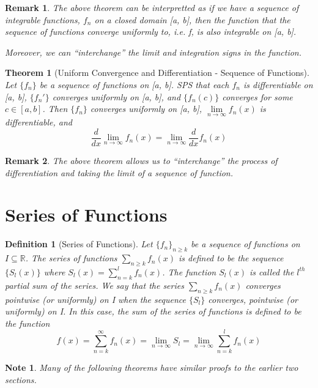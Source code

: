 \documentclass[11pt, oneside]{book}
\theoremstyle{break}
\newtheorem{thm}{Theorem}[section]
\newtheorem*{remark}{Remark}
\newtheorem*{note}{Note}
\newtheorem{defn}{Definition}[section]
\newcommand{\bb}[1]{\mathbb{#1}}		%
\begin{document}
\begin{remark}
	The above theorem can be interpretted as if we have a sequence of integrable functions, $f_n$ on a closed domain [a, b], then the function that the sequence of functions converge uniformly to, i.e. f, is also integrable on [a, b].

	Moreover, we can ``interchange'' the limit and integration signs in the function.
\end{remark}

\begin{thm}[Uniform Convergence and Differentiation - Sequence of Functions]
	Let $\{f_n\}$ be a sequence of functions on [a, b]. SPS that each $f_n$ is differentiable on [a, b], $\{f_n'\}$ converges uniformly on [a, b], and $\{f_n(c)\}$ converges for some $c \in [a, b]$. Then $\{f_n\}$ converges uniformly on [a, b], $\lim\limits_{n \to \infty} f_n(x)$ is differentiable, and
	\[
		\frac{d}{dx} \lim_{n \to \infty} f_n(x) = \lim_{n \to \infty} \frac{d}{dx} f_n(x)
	\]
\end{thm}

\begin{remark}
	The above theorem allows us to ``interchange'' the process of differentiation and taking the limit of a sequence of function.
\end{remark}


\section{Series of Functions}
\begin{defn}[Series of Functions]
	Let $\{f_n\}_{n \geq k}$ be a sequence of functions on $I \subseteq \bb{R}$. The series of functions $\sum\limits_{n \geq k} f_n(x)$ is defined to be the sequence $\{S_l(x)\}$ where $S_l(x) = \sum\limits_{n = k}^{l} f_n(x)$. The function $S_l(x)$ is called the $l^{th}$ partial sum of the series. We say that the series $\sum\limits_{n \geq k} f_n(x)$ converges pointwise (or uniformly) on I when the sequence $\{S_l\}$ converges, pointwise (or uniformly) on I. In this case, the sum of the series of functions is defined to be the function
	\[
		f(x) = \sum_{n = k}^{\infty} f_n(x) = \lim_{n \to \infty} S_l = \lim_{n \to \infty} \sum_{n = k}^{l} f_n(x)
	\]
\end{defn}

\begin{note}
	Many of the following theorems have similar proofs to the earlier two sections.
\end{note}
\end{document}
